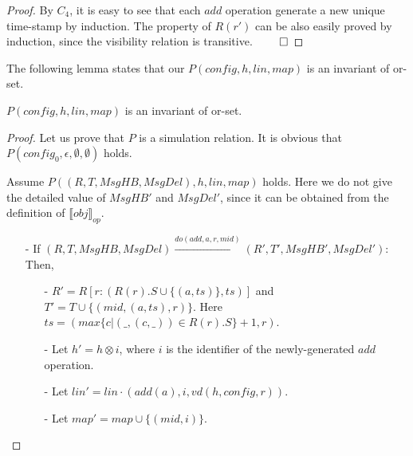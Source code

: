 {\begin {proof}
By $C_4$, it is easy to see that each $\mathit{add}$ operation generate a new unique time-stamp by induction. The property of $R(r')$ can be also easily proved by induction, since the visibility relation is transitive. $\qed$
\end {proof}


The following lemma states that our $P(\mathit{config},h,\mathit{lin},\mathit{map})$ is an invariant of or-set.

\begin{lemma}
\label{lemma:P is an invariant of or-set}
$P(\mathit{config},h,\mathit{lin},\mathit{map})$ is an invariant of or-set.
\end{lemma}

\begin {proof}

Let us prove that $P$ is a simulation relation. It is obvious that $P(\mathit{config}_0,\epsilon,\emptyset,\emptyset)$ holds.

Assume $P((R,T,\mathit{MsgHB},\mathit{MsgDel}),h,\mathit{lin},\mathit{map})$ holds. Here we do not give the detailed value of $\mathit{MsgHB}'$ and $\mathit{MsgDel}'$, since it can be obtained from the definition of $\llbracket \mathit{obj} \rrbracket_{\mathit{op}}$.

\begin{itemize}
\setlength{\itemsep}{0.5pt}
\item[-] If $(R,T,\mathit{MsgHB},\mathit{MsgDel}) {\xrightarrow{\mathit{do}(\mathit{add},a,r,\mathit{mid})}} (R',T',\mathit{MsgHB}',\mathit{MsgDel}')$: Then,

    \begin{itemize}
    \setlength{\itemsep}{0.5pt}
    \item[-] $R' = R[ r: (R(r).S \cup \{ (a,\mathit{ts}) \},\mathit{ts}) ]$ and $T' = T \cup \{ (\mathit{mid},(a,\mathit{ts}),r) \}$. Here $\mathit{ts} = ( \mathit{max} \{ c \vert (\_,(c,\_)) \in R(r).S \} +1,r)$.

    \item[-] Let $h' = h \otimes i$, where $i$ is the identifier of the newly-generated $\mathit{add}$ operation.

    \item[-] Let $\mathit{lin}' = \mathit{lin} \cdot (\mathit{add}(a),i,\mathit{vd}(h,\mathit{config},r))$.

    \item[-] Let $\mathit{map}' = \mathit{map} \cup \{ (\mathit{mid},i) \}$.
    \end{itemize}


\end{itemize}
\end{proof}}
